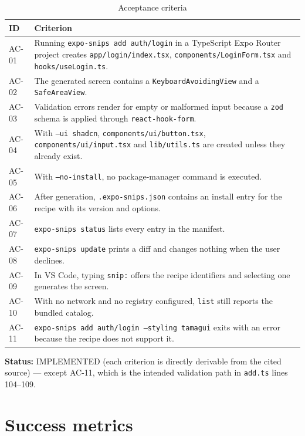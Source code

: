 \begin{longtable}{p{1.3cm}p{12.6cm}}
\caption{Acceptance criteria}\\
\toprule
\textbf{ID} & \textbf{Criterion} \\
\midrule

AC-01 & Running \texttt{expo-snips add auth/login} in a TypeScript Expo Router project creates \texttt{app/login/index.tsx}, \texttt{components/LoginForm.tsx} and \texttt{hooks/useLogin.ts}. \\
AC-02 & The generated screen contains a \texttt{KeyboardAvoidingView} and a \texttt{SafeAreaView}. \\
AC-03 & Validation errors render for empty or malformed input because a \texttt{zod} schema is applied through \texttt{react-hook-form}. \\
AC-04 & With \texttt{--ui shadcn}, \texttt{components/ui/button.tsx}, \texttt{components/ui/input.tsx} and \texttt{lib/utils.ts} are created unless they already exist. \\
AC-05 & With \texttt{--no-install}, no package-manager command is executed. \\
AC-06 & After generation, \texttt{.expo-snips.json} contains an install entry for the recipe with its version and options. \\
AC-07 & \texttt{expo-snips status} lists every entry in the manifest. \\
AC-08 & \texttt{expo-snips update} prints a diff and changes nothing when the user declines. \\
AC-09 & In VS Code, typing \texttt{snip:} offers the recipe identifiers and selecting one generates the screen. \\
AC-10 & With no network and no registry configured, \texttt{list} still reports the bundled catalog. \\
AC-11 & \texttt{expo-snips add auth/login --styling tamagui} exits with an error because the recipe does not support it. \\
\bottomrule
\end{longtable}

\textbf{Status:} IMPLEMENTED (each criterion is directly derivable from the cited
source) --- except AC-11, which is the intended validation path in
\texttt{add.ts} lines 104--109.

\section{Success metrics}

